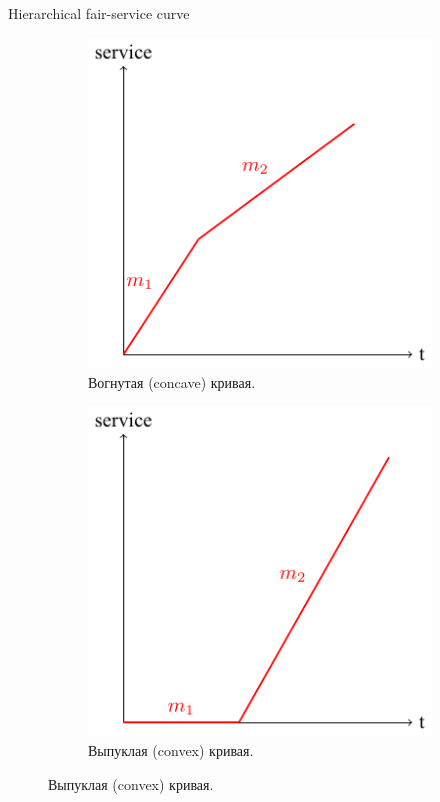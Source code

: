 \documentclass[12pt]{beamer}
\begin{document}
\begin{frame}{Hierarchical fair-service curve}

\begin{figure}
  \begin{subfigure}[b]{0.3\textwidth}
     \includegraphics[width=\textwidth]{../text/src/pdfimages/hfsc_concave.pdf}
    \caption*{{\scriptsize Вогнутая (concave) кривая.}}
    \label{fig:f1}
  \end{subfigure}
  \hspace{0.2\textwidth}
  \begin{subfigure}[b]{0.3\textwidth}
    \includegraphics[width=\textwidth]{../text/src/pdfimages/hfsc_convex.pdf}
    \caption*{{\scriptsize Выпуклая (convex) кривая.}}
    \label{fig:f2}
  \end{subfigure}
\end{figure}


\end{frame}
\end{document}

